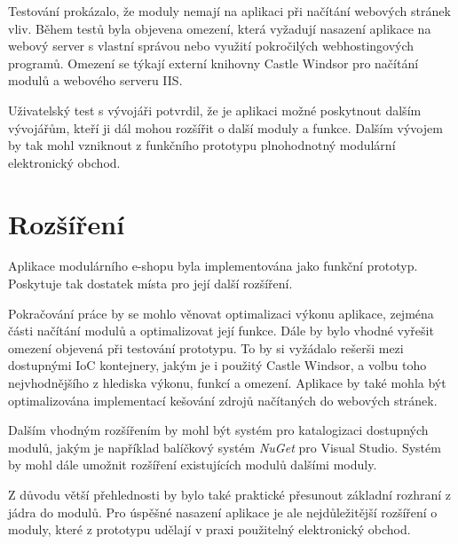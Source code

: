 \documentclass[11pt,twoside,a4paper]{book}
\begin{document}
Testování prokázalo, že moduly nemají na aplikaci při načítání webových stránek vliv. Během testů byla objevena omezení, která vyžadují nasazení aplikace na webový server s vlastní správou nebo využití pokročilých webhostingových programů. Omezení se týkají externí knihovny Castle Windsor pro načítání modulů a webového serveru IIS. 

Uživatelský test s vývojáři potvrdil, že je aplikaci možné poskytnout dalším vývojářům, kteří ji dál mohou rozšířit o další moduly a funkce. Dalším vývojem by tak mohl vzniknout z funkčního prototypu plnohodnotný modulární elektronický obchod.




\section{Rozšíření}

Aplikace modulárního e-shopu byla implementována jako funkční prototyp. Poskytuje tak dostatek místa pro její další rozšíření. 

Pokračování práce by se mohlo věnovat optimalizaci výkonu aplikace, zejména části načítání modulů a optimalizovat její funkce. Dále by bylo vhodné vyřešit omezení objevená při testování prototypu. To by si vyžádalo rešerši mezi dostupnými IoC kontejnery, jakým je i použitý Castle Windsor, a volbu toho nejvhodnějšího z hlediska výkonu, funkcí a omezení. Aplikace by také mohla být optimalizována implementací kešování zdrojů načítaných do webových stránek.

Dalším vhodným rozšířením by mohl být systém pro katalogizaci dostupných modulů, jakým je například balíčkový systém \textit{NuGet} pro Visual Studio. %
Systém by mohl dále umožnit rozšíření existujících modulů dalšími moduly.

Z důvodu větší přehlednosti by bylo také praktické přesunout základní rozhraní z jádra do modulů. Pro úspěšné nasazení aplikace je ale nejdůležitější rozšíření o moduly, které z prototypu udělají v praxi použitelný elektronický obchod.



\end{document}
